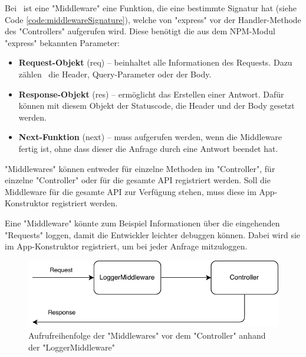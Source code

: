 \label{sec:middleware}

Bei \ZELIA\ ist eine "Middleware" eine Funktion, die eine bestimmte Signatur hat (siehe Code \ref{code:middlewareSignature}), welche von "express" vor der Handler-Methode des "Controllers" aufgerufen wird. 
Diese benötigt die aus dem NPM-Modul "express" bekannten Parameter:

\begin{itemize}
    \item \textbf{Request-Objekt} ({\ttfamily req}) -- beinhaltet alle Informationen des Requests. Dazu zählen \zb\ die Header, Query-Parameter oder der Body.
    \item \textbf{Response-Objekt} ({\ttfamily res}) -- ermöglicht das Erstellen einer Antwort. Dafür können mit diesem Objekt der Statuscode, die Header und der Body gesetzt werden.
    \item \textbf{Next-Funktion} ({\ttfamily next}) -- muss aufgerufen werden, wenn die Middleware fertig ist, ohne dass dieser die Anfrage durch eine Antwort beendet hat.
\end{itemize}

"Middlewares" können entweder für einzelne Methoden im "Controller", für einzelne "Controller" oder für die gesamte API registriert werden. Soll die Middleware für die gesamte API zur Verfügung stehen, muss diese im App-Konstruktor registriert werden.



Eine "Middleware" könnte zum Beispiel Informationen über die eingehenden "Requests" loggen, damit die Entwickler leichter debuggen können. 
Dabei wird sie im \linebreak App-Konstruktor registriert, um bei jeder Anfrage mitzuloggen. 

\begin{figure}[H]
    \centering
    \includegraphics{media/APITemplate/LogMiddleware.svg.pdf}
    \caption{Aufrufreihenfolge der "Middlewares" vor dem "Controller" anhand der "LoggerMiddleware"} 
\end{figure}

